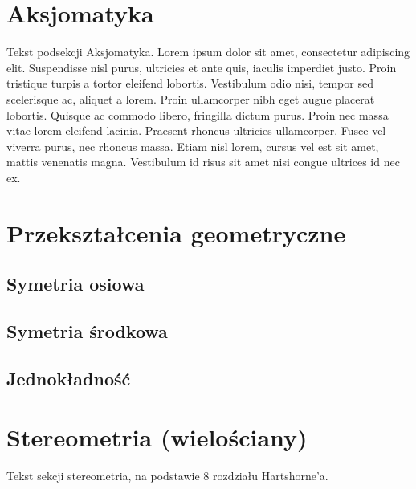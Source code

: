 \documentclass{greaseproof}
\newcommand{\loremipsum}{ {\color{gray}  Lorem ipsum dolor sit amet, consectetur adipiscing elit. Suspendisse nisl purus, ultricies et ante quis, iaculis imperdiet justo. Proin tristique turpis a tortor eleifend lobortis. Vestibulum odio nisi, tempor sed scelerisque ac, aliquet a lorem. Proin ullamcorper nibh eget augue placerat lobortis. Quisque ac commodo libero, fringilla dictum purus. Proin nec massa vitae lorem eleifend lacinia. Praesent rhoncus ultricies ullamcorper. Fusce vel viverra purus, nec rhoncus massa. Etiam nisl lorem, cursus vel est sit amet, mattis venenatis magna. Vestibulum id risus sit amet nisi congue ultrices id nec ex. } }
\begin{document}


\section{Aksjomatyka}
Tekst podsekcji Aksjomatyka. \loremipsum



\section{Przekształcenia geometryczne}
\subsection{Symetria osiowa}
\subsection{Symetria środkowa}
\subsection{Jednokładność}














\section{Stereometria (wielościany)}
Tekst sekcji stereometria, na podstawie 8 rozdziału Hartshorne'a.
























{}


\raggedright
{}
\printindex

\printindex[persons]
\end{document}
